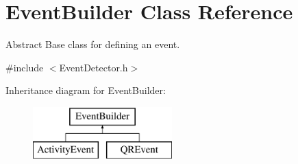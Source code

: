 \hypertarget{class_event_builder}{}\section{Event\+Builder Class Reference}
\label{class_event_builder}


Abstract Base class for defining an event.  




{\ttfamily \#include $<$Event\+Detector.\+h$>$}

Inheritance diagram for Event\+Builder\+:\begin{figure}[H]
\begin{center}
\leavevmode
\includegraphics[height=2.000000cm]{class_event_builder}
\end{center}
\end{figure}
